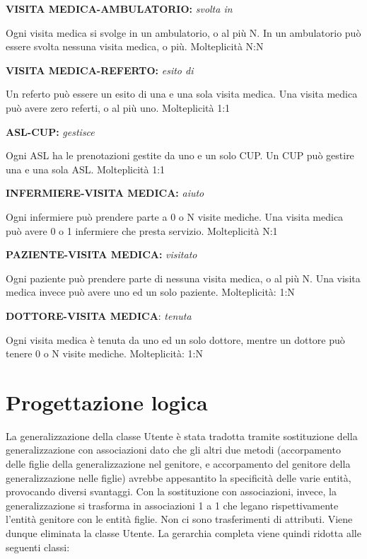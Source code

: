 \documentclass{report}
\begin{document}
\begin{center}
\textbf{VISITA MEDICA-AMBULATORIO:} \textit{svolta in }
\end{center}
Ogni visita medica si svolge in un ambulatorio, o al più N. In un ambulatorio può essere svolta nessuna visita medica, o più.
Molteplicità N:N

\begin{center}
\textbf{VISITA MEDICA-REFERTO:} \textit{esito di}
\end{center}
Un referto può essere un esito di una e una sola visita medica. Una visita medica può avere zero referti, o al più uno.
Molteplicità 1:1

\begin{center}
\textbf{ASL-CUP:} \textit{gestisce}
\end{center}
Ogni ASL ha le prenotazioni gestite da uno e un solo CUP. Un CUP può gestire una e una sola ASL.
Molteplicità 1:1

\begin{center}
\textbf{INFERMIERE-VISITA MEDICA:} \textit{aiuto}
\end{center}
Ogni infermiere può prendere parte a 0 o N visite mediche. Una visita medica può avere 0 o 1 infermiere che presta servizio.
Molteplicità N:1

\begin{center}
\textbf{PAZIENTE-VISITA MEDICA:} \textit{visitato} 
\end{center}
Ogni paziente può prendere parte di nessuna visita medica, o al più N. Una visita medica invece può avere uno ed un solo paziente.
Molteplicità: 1:N

\begin{center}
\textbf{DOTTORE-VISITA MEDICA}: \textit{tenuta}
\end{center}
Ogni visita medica è tenuta da uno ed un solo dottore, mentre un dottore può tenere 0 o N visite mediche.
Molteplicità: 1:N


\section*{Progettazione logica}
La generalizzazione della classe Utente è stata tradotta tramite sostituzione della generalizzazione con associazioni dato che gli altri due metodi (accorpamento delle figlie della generalizzazione nel genitore, e accorpamento del genitore della generalizzazione nelle figlie) avrebbe appesantito la specificità delle varie entità, provocando diversi svantaggi. Con la sostituzione con associazioni, invece, la generalizzazione si trasforma in associazioni 1 a 1 che legano rispettivamente l'entità genitore con le entità figlie. Non ci sono trasferimenti di attributi.
Viene dunque eliminata la classe Utente. La gerarchia completa viene quindi ridotta alle seguenti classi:
\end{document}
